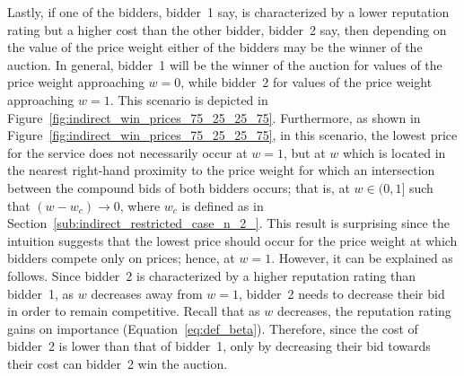 Lastly, if one of the bidders, bidder~1 say, is characterized by a lower reputation rating but a higher cost than the other bidder, bidder~2 say, then depending on the value of the price weight either of the bidders may be the winner of the auction. In general, bidder~1 will be the winner of the auction for values of the price weight approaching $w=0$, while bidder~2 for values of the price weight approaching $w=1$. This scenario is depicted in Figure~\ref{fig:indirect_win_prices_75_25_25_75}. Furthermore, as shown in Figure~\ref{fig:indirect_win_prices_75_25_25_75}, in this scenario, the lowest price for the service does not necessarily occur at $w=1$, but at $w$ which is located in the nearest right-hand proximity to the price weight for which an intersection between the compound bids of both bidders occurs; that is, at $w\in (0,1]$ such that $(w - w_c)\to 0$, where $w_c$ is defined as in Section~\ref{sub:indirect_restricted_case_n_2_}. This result is surprising since the intuition suggests that the lowest price should occur for the price weight at which bidders compete only on prices; hence, at $w=1$. However, it can be explained as follows. Since bidder~2 is characterized by a higher reputation rating than bidder~1, as $w$ decreases away from $w=1$, bidder~2 needs to decrease their bid in order to remain competitive. Recall that as $w$ decreases, the reputation rating gains on importance (Equation~\eqref{eq:def_beta}). Therefore, since the cost of bidder~2 is lower than that of bidder~1, only by decreasing their bid towards their cost can bidder~2 win the auction.


